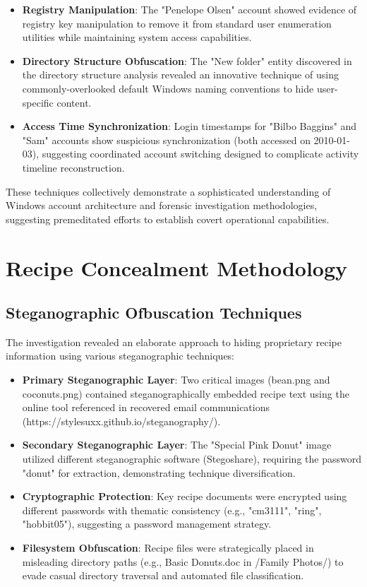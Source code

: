 \begin{itemize}
    \item \textbf{Registry Manipulation}: The "Penelope Olsen" account showed evidence of registry key manipulation to remove it from standard user enumeration utilities while maintaining system access capabilities.
    
    \item \textbf{Directory Structure Obfuscation}: The "New folder" entity discovered in the directory structure analysis revealed an innovative technique of using commonly-overlooked default Windows naming conventions to hide user-specific content.
    
    \item \textbf{Access Time Synchronization}: Login timestamps for "Bilbo Baggins" and "Sam" accounts show suspicious synchronization (both accessed on 2010-01-03), suggesting coordinated account switching designed to complicate activity timeline reconstruction.
\end{itemize}

These techniques collectively demonstrate a sophisticated understanding of Windows account architecture and forensic investigation methodologies, suggesting premeditated efforts to establish covert operational capabilities.

\section{Recipe Concealment Methodology}
\subsection{Steganographic Ofbuscation Techniques}
The investigation revealed an elaborate approach to hiding proprietary recipe information using various steganographic techniques:

\begin{itemize}
    \item \textbf{Primary Steganographic Layer}: Two critical images (bean.png and coconuts.png) contained steganographically embedded recipe text using the online tool referenced in recovered email communications (https://stylesuxx.github.io/steganography/).
    
    \item \textbf{Secondary Steganographic Layer}: The "Special Pink Donut" image utilized different steganographic software (Stegoshare), requiring the password "donut" for extraction, demonstrating technique diversification.
    
    \item \textbf{Cryptographic Protection}: Key recipe documents were encrypted using different passwords with thematic consistency (e.g., "cm3111", "ring", "hobbit05"), suggesting a password management strategy.
    
    \item \textbf{Filesystem Obfuscation}: Recipe files were strategically placed in misleading directory paths (e.g., Basic Donuts.doc in /Family Photos/) to evade casual directory traversal and automated file classification.
\end{itemize}

